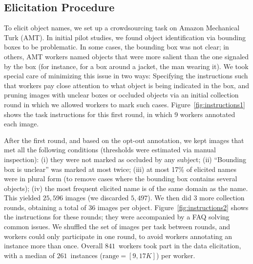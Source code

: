 \subsection{Elicitation Procedure}
\label{ssec:elicitation}

To elicit object names, we set up a crowdsourcing task on Amazon Mechanical Turk (AMT).
In initial pilot studies, we found object identification via bounding boxes to be problematic.
In some cases, the bounding box was not clear; in others, AMT workers named objects that were more salient than the one signaled by the box (for instance, for a box around a jacket, the man wearing it).
We took special care of minimizing this issue in two ways: Specifying the instructions such that workers pay close attention to what object is being indicated in the box, and pruning images with unclear boxes or occluded objects via an initial collection round in which we allowed workers to mark such cases.
Figure~\ref{fig:instructions1} shows the task instructions for this first round, in which 9 workers annotated each image.

After the first round, and based on the opt-out annotation, we kept images that met all the following conditions (thresholds were estimated via manual inspection): (i) they were not marked as occluded by any subject; (ii) ``Bounding box is unclear'' was marked at most twice; (iii) at most 17\% of elicited names were in plural form (to remove cases where the bounding box contains several objects); (iv) the most frequent elicited name is of the same domain as the \vgenome name.
This yielded $25,596$ images (we discarded $5,497$).
We then did 3 more collection rounds, obtaining a total of 36 images per object.
Figure~\ref{fig:instructions2} shows the instructions for these rounds; they were accompanied by a FAQ solving common issues. 
We shuffled the set of images per task between rounds, and workers could only participate in one round, to avoid workers annotating an instance more than once.
Overall $841$\ workers took part in the data elicitation, with a median of  $261$\ instances \mbox{($\textrm{range}=[9,17K]$)} per worker.

